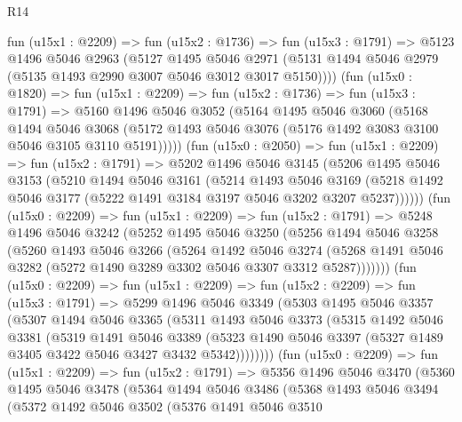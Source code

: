\begin{lexlean}{R14}
\begin{coremodule}
    fun (u15x1 : @2209) =>
    fun (u15x2 : @1736) =>
    fun (u15x3 : @1791) =>
    @5123
      @1496
      @5046
      @2963
      (@5127
        @1495
        @5046
        @2971
        (@5131 @1494 @5046 @2979 (@5135 @1493 @2990 @3007 @5046 @3012 @3017 @5150))))
    (fun (u15x0 : @1820) =>
    fun (u15x1 : @2209) =>
    fun (u15x2 : @1736) =>
    fun (u15x3 : @1791) =>
    @5160
      @1496
      @5046
      @3052
      (@5164
        @1495
        @5046
        @3060
        (@5168
          @1494
          @5046
          @3068
          (@5172 @1493 @5046 @3076 (@5176 @1492 @3083 @3100 @5046 @3105 @3110 @5191)))))
    (fun (u15x0 : @2050) =>
    fun (u15x1 : @2209) =>
    fun (u15x2 : @1791) =>
    @5202
      @1496
      @5046
      @3145
      (@5206
        @1495
        @5046
        @3153
        (@5210
          @1494
          @5046
          @3161
          (@5214
            @1493
            @5046
            @3169
            (@5218 @1492 @5046 @3177 (@5222 @1491 @3184 @3197 @5046 @3202 @3207 @5237))))))
    (fun (u15x0 : @2209) =>
    fun (u15x1 : @2209) =>
    fun (u15x2 : @1791) =>
    @5248
      @1496
      @5046
      @3242
      (@5252
        @1495
        @5046
        @3250
        (@5256
          @1494
          @5046
          @3258
          (@5260
            @1493
            @5046
            @3266
            (@5264
              @1492
              @5046
              @3274
              (@5268 @1491 @5046 @3282 (@5272 @1490 @3289 @3302 @5046 @3307 @3312 @5287)))))))
    (fun (u15x0 : @2209) =>
    fun (u15x1 : @2209) =>
    fun (u15x2 : @2209) =>
    fun (u15x3 : @1791) =>
    @5299
      @1496
      @5046
      @3349
      (@5303
        @1495
        @5046
        @3357
        (@5307
          @1494
          @5046
          @3365
          (@5311
            @1493
            @5046
            @3373
            (@5315
              @1492
              @5046
              @3381
              (@5319
                @1491
                @5046
                @3389
                (@5323 @1490 @5046 @3397 (@5327 @1489 @3405 @3422 @5046 @3427 @3432 @5342))))))))
    (fun (u15x0 : @2209) =>
    fun (u15x1 : @2209) =>
    fun (u15x2 : @1791) =>
    @5356
      @1496
      @5046
      @3470
      (@5360
        @1495
        @5046
        @3478
        (@5364
          @1494
          @5046
          @3486
          (@5368
            @1493
            @5046
            @3494
            (@5372
              @1492
              @5046
              @3502
              (@5376
                @1491
                @5046
                @3510

\end{coremodule}
\end{lexlean}
